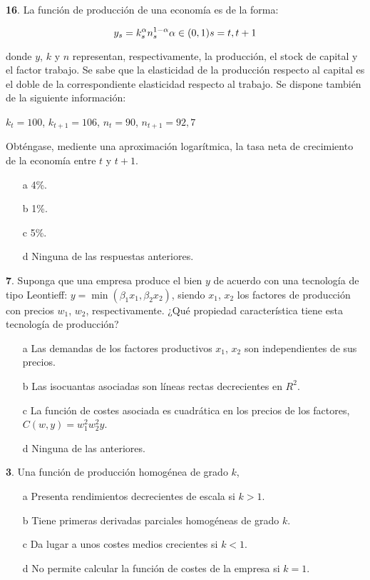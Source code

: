 \documentclass{nuevotema}
\begin{document}
\textbf{16}. La función de producción de una economía es de la forma:

\begin{equation}
y_s = k_s ^\alpha n_s^{1-\alpha} \\
\alpha \in (0,1) \\
s=t, t+1
\end{equation}

donde $y$, $k$ y $n$ representan, respectivamente, la producción, el stock de capital y el factor trabajo. Se sabe que la elasticidad de la producción respecto al capital es el doble de la correspondiente elasticidad respecto al trabajo. Se dispone también de la siguiente información:

$k_t=100$, $k_{t+1}=106$, $n_t = 90$, $n_{t+1}=92,7$

Obténgase, mediente una aproximación logarítmica, la tasa neta de crecimiento de la economía entre $t$ y $t+1$.

\begin{enumerate}
	\item[a] 4\%.
	\item[b] 1\%.
	\item[c] 5\%.
	\item[d] Ninguna de las respuestas anteriores. 
\end{enumerate}


\textbf{7}. Suponga que una empresa produce el bien $y$ de acuerdo con una tecnología de tipo Leontieff: $y = \min (\beta_1 x_1, \beta_2 x_2)$, siendo $x_1$, $x_2$ los factores de producción con precios $w_1$, $w_2$, respectivamente. ¿Qué propiedad característica tiene esta tecnología de producción?

\begin{enumerate}
	\item[a] Las demandas de los factores productivos $x_1$, $x_2$ son independientes de sus precios.
	\item[b] Las isocuantas asociadas son líneas rectas decrecientes en $R^2$.
	\item[c] La función de costes asociada es cuadrática en los precios de los factores, $C(w,y) = w_1^2w_2^2y$.
	\item[d] Ninguna de las anteriores.
\end{enumerate}


\textbf{3}. Una función de producción homogénea de grado $k$,

\begin{enumerate}
	\item[a] Presenta rendimientos decrecientes de escala si $k>1$.
	\item[b] Tiene primeras derivadas parciales homogéneas de grado $k$.
	\item[c] Da lugar a unos costes medios crecientes si $k<1$.
	\item[d] No permite calcular la función de costes de la empresa si $k=1$.
\end{enumerate}
\end{document}
